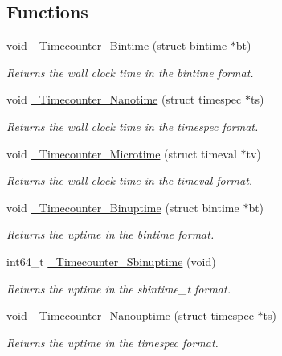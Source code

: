 \subsection*{Functions}
\begin{DoxyCompactItemize}
\item 
void \mbox{\hyperlink{group__RTEMSScoreTimecounter_ga988aedc781dc73e89a481adb99455d21}{\+\_\+\+Timecounter\+\_\+\+Bintime}} (struct bintime $\ast$bt)
\begin{DoxyCompactList}\small\item\em Returns the wall clock time in the bintime format. \end{DoxyCompactList}\item 
void \mbox{\hyperlink{group__RTEMSScoreTimecounter_ga27875b3222b3884499771611d7902380}{\+\_\+\+Timecounter\+\_\+\+Nanotime}} (struct timespec $\ast$ts)
\begin{DoxyCompactList}\small\item\em Returns the wall clock time in the timespec format. \end{DoxyCompactList}\item 
void \mbox{\hyperlink{group__RTEMSScoreTimecounter_ga186755758b9fbe63a174ddf24eec5986}{\+\_\+\+Timecounter\+\_\+\+Microtime}} (struct timeval $\ast$tv)
\begin{DoxyCompactList}\small\item\em Returns the wall clock time in the timeval format. \end{DoxyCompactList}\item 
void \mbox{\hyperlink{group__RTEMSScoreTimecounter_ga8c656c32ac30398dedcec9f43163bee4}{\+\_\+\+Timecounter\+\_\+\+Binuptime}} (struct bintime $\ast$bt)
\begin{DoxyCompactList}\small\item\em Returns the uptime in the bintime format. \end{DoxyCompactList}\item 
int64\+\_\+t \mbox{\hyperlink{group__RTEMSScoreTimecounter_ga2fa28f3700d306d5ba38343f2c8d1867}{\+\_\+\+Timecounter\+\_\+\+Sbinuptime}} (void)
\begin{DoxyCompactList}\small\item\em Returns the uptime in the sbintime\+\_\+t format. \end{DoxyCompactList}\item 
void \mbox{\hyperlink{group__RTEMSScoreTimecounter_ga69193b209ce281570491732c00be6cb9}{\+\_\+\+Timecounter\+\_\+\+Nanouptime}} (struct timespec $\ast$ts)
\begin{DoxyCompactList}\small\item\em Returns the uptime in the timespec format. \end{DoxyCompactList}\item 

\end{DoxyCompactItemize}

